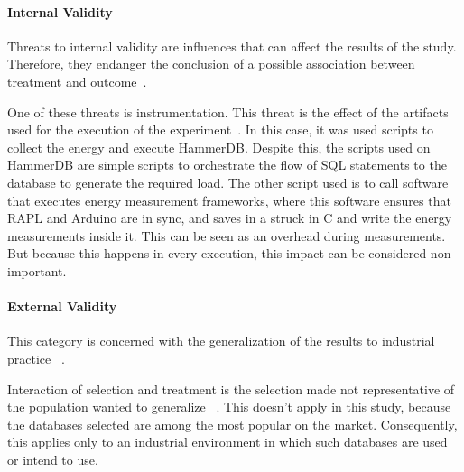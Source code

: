 \paragraph{Internal Validity}


Threats to internal validity are influences that can affect the results of the study. Therefore, they endanger the conclusion of a possible association between treatment and outcome~\cite{10.5555/2349018}.


One of these threats is instrumentation. This threat is the effect of the artifacts used for the execution of the experiment~\cite{10.5555/2349018}. In this case, it was used scripts to collect the energy and execute HammerDB. Despite this, the scripts used on HammerDB are simple scripts to orchestrate the flow of SQL statements to the database to generate the required load. The other script used is to call software that executes energy measurement frameworks, where this software ensures that RAPL and Arduino are in sync, and saves in a struck in C and write the energy measurements inside it.  This can be seen as an overhead during measurements. But because this happens in every execution, this impact can be considered non-important. 



    

\paragraph{External Validity}


This category is concerned with the generalization of the results to industrial practice ~\cite{10.5555/2349018}.



Interaction of selection and treatment is the selection made not representative of the population wanted to generalize ~\cite{10.5555/2349018}. This doesn't apply in this study, because the databases selected are among the most popular on the market. Consequently, this applies only to an industrial environment in which such databases are used or intend to use.


